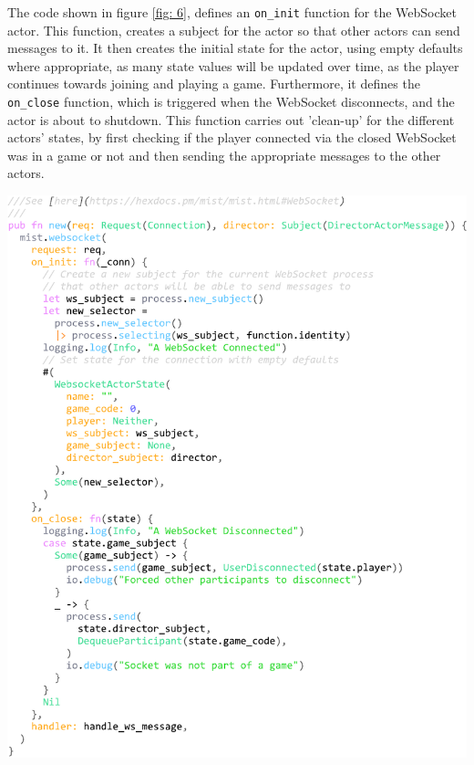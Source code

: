 \documentclass[]{final}
\begin{document}
\noindent
\begin{minipage}[t]{15em}
  \vspace*{-12cm}
  The code shown in figure \ref{fig: 6}, defines an \lstinline|on_init| function for the WebSocket actor. This function,
  creates a subject for the actor so that other actors can send messages to it.
  It then creates the initial state for the actor, using empty defaults where appropriate,
  as many state values will be updated over time, as the player continues towards
  joining and playing a game. Furthermore, it defines the \lstinline|on_close| function,
  which is triggered when the WebSocket disconnects, and the actor is about to shutdown. This function carries out
  'clean-up' for the different actors' states, by first checking if the player
  connected via the closed WebSocket was in a game or not and then sending the
  appropriate messages to the other actors.
\end{minipage}
\hfill
\begin{minipage}[t]{25em}
  \includegraphics[width=\textwidth]{mist_websocket.pdf}
  \label{fig:6}
\end{minipage}
\end{document}
